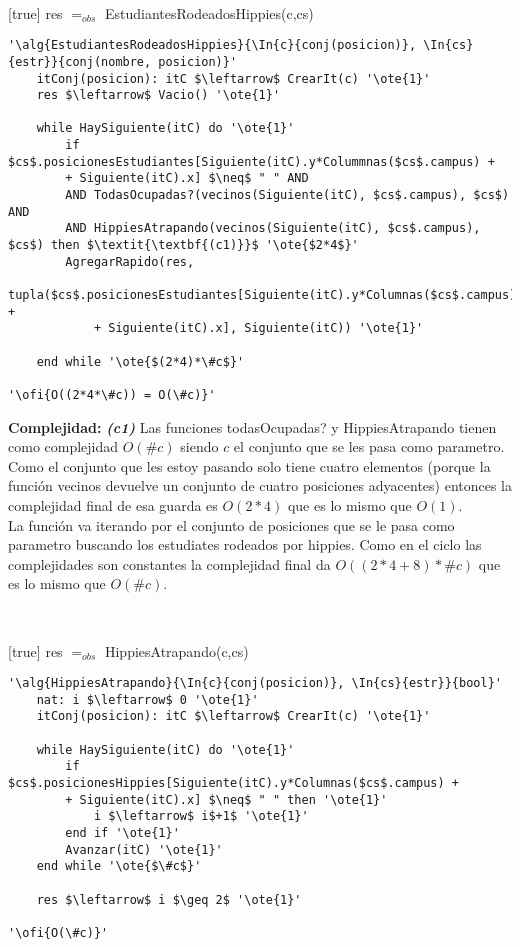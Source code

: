~


[true]
{res $=_{obs}$ EstudiantesRodeadosHippies(c,cs)}

\begin{lstlisting}[mathescape]
'\alg{EstudiantesRodeadosHippies}{\In{c}{conj(posicion)}, \In{cs}{estr}}{conj(nombre, posicion)}'
	itConj(posicion): itC $\leftarrow$ CrearIt(c) '\ote{1}'
	res $\leftarrow$ Vacio() '\ote{1}'

	while HaySiguiente(itC) do '\ote{1}'
		if $cs$.posicionesEstudiantes[Siguiente(itC).y*Colummnas($cs$.campus) +
		+ Siguiente(itC).x] $\neq$ " " AND
		AND TodasOcupadas?(vecinos(Siguiente(itC), $cs$.campus), $cs$) AND
		AND HippiesAtrapando(vecinos(Siguiente(itC), $cs$.campus), $cs$) then $\textit{\textbf{(c1)}}$ '\ote{$2*4$}'
		AgregarRapido(res,
			tupla($cs$.posicionesEstudiantes[Siguiente(itC).y*Columnas($cs$.campus) +
			+ Siguiente(itC).x], Siguiente(itC)) '\ote{1}'

	end while '\ote{$(2*4)*\#c$}'

'\ofi{O((2*4*\#c)) = O(\#c)}'
\end{lstlisting}

\textbf{Complejidad:} \textit{\textbf{(c1)}} Las funciones todasOcupadas? y HippiesAtrapando tienen como complejidad $O(\#c)$ siendo $c$ el conjunto que se les pasa como parametro. Como el conjunto que les estoy pasando solo tiene cuatro elementos (porque la función vecinos devuelve un conjunto de cuatro posiciones adyacentes) entonces la complejidad final de esa guarda es $O(2*4)$ que es lo mismo que $O(1)$. \\
La función va iterando por el conjunto de posiciones que se le pasa como parametro buscando los estudiates rodeados por hippies. Como en el ciclo las complejidades son constantes la complejidad final da $O((2*4+8)*\#c)$ que es lo mismo que $O(\#c)$.


~


[true]
{res $=_{obs}$ HippiesAtrapando(c,cs)}

\begin{lstlisting}[mathescape]
'\alg{HippiesAtrapando}{\In{c}{conj(posicion)}, \In{cs}{estr}}{bool}'
	nat: i $\leftarrow$ 0 '\ote{1}'
	itConj(posicion): itC $\leftarrow$ CrearIt(c) '\ote{1}'

	while HaySiguiente(itC) do '\ote{1}'
		if $cs$.posicionesHippies[Siguiente(itC).y*Columnas($cs$.campus) +
		+ Siguiente(itC).x] $\neq$ " " then '\ote{1}'
			i $\leftarrow$ i$+1$ '\ote{1}'
		end if '\ote{1}'
		Avanzar(itC) '\ote{1}'
	end while '\ote{$\#c$}'

	res $\leftarrow$ i $\geq 2$ '\ote{1}'

'\ofi{O(\#c)}'
\end{lstlisting}

